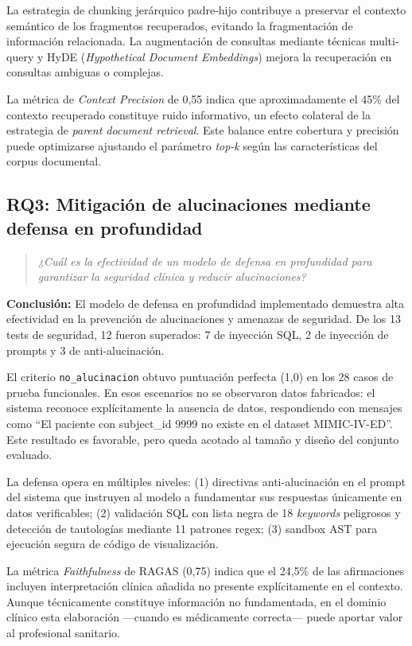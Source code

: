 La estrategia de chunking jerárquico padre-hijo contribuye a preservar el contexto semántico de los fragmentos recuperados, evitando la fragmentación de información relacionada. La augmentación de consultas mediante técnicas multi-query y \ac{HyDE} (\textit{Hypothetical Document Embeddings}) mejora la recuperación en consultas ambiguas o complejas.

La métrica de \textit{Context Precision} de 0,55 indica que aproximadamente el 45\% del contexto recuperado constituye ruido informativo, un efecto colateral de la estrategia de \textit{parent document retrieval}. Este balance entre cobertura y precisión puede optimizarse ajustando el parámetro \textit{top-k} según las características del corpus documental.

\subsection{RQ3: Mitigación de alucinaciones mediante defensa en profundidad}

\begin{quote}
\textit{¿Cuál es la efectividad de un modelo de defensa en profundidad para garantizar la seguridad clínica y reducir alucinaciones?}
\end{quote}

\textbf{Conclusión:} El modelo de defensa en profundidad implementado demuestra alta efectividad en la prevención de alucinaciones y amenazas de seguridad. De los 13 tests de seguridad, 12 fueron superados: 7 de inyección \ac{SQL}, 2 de inyección de prompts y 3 de anti-alucinación.

El criterio \texttt{no\_alucinacion} obtuvo puntuación perfecta (1,0) en los 28 casos de prueba funcionales. En esos escenarios no se observaron datos fabricados: el sistema reconoce explícitamente la ausencia de datos, respondiendo con mensajes como ``El paciente con subject\_id 9999 no existe en el dataset \acs{MIMIC}-IV-\acs{ED}''. Este resultado es favorable, pero queda acotado al tamaño y diseño del conjunto evaluado.

La defensa opera en múltiples niveles: (1) directivas anti-alucinación en el prompt del sistema que instruyen al modelo a fundamentar sus respuestas únicamente en datos verificables; (2) validación \ac{SQL} con lista negra de 18 \textit{keywords} peligrosos y detección de tautologías mediante 11 patrones regex; (3) sandbox \ac{AST} para ejecución segura de código de visualización.

La métrica \textit{Faithfulness} de \ac{RAGAS} (0,75) indica que el 24,5\% de las afirmaciones incluyen interpretación clínica añadida no presente explícitamente en el contexto. Aunque técnicamente constituye información no fundamentada, en el dominio clínico esta elaboración ---cuando es médicamente correcta--- puede aportar valor al profesional sanitario.

